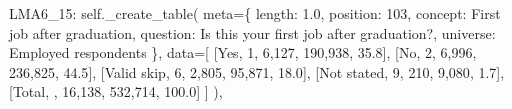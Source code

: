 \documentclass[
  11pt,
  a4paper,
]{article}
\newenvironment{Shaded}{\begin{snugshade}}{\end{snugshade}}
\newcommand{\NormalTok}[1]{\textcolor[rgb]{0.00,0.23,0.31}{#1}}
\newcommand{\OperatorTok}[1]{\textcolor[rgb]{0.37,0.37,0.37}{#1}}
\newcommand{\StringTok}[1]{\textcolor[rgb]{0.13,0.47,0.30}{#1}}
\newcommand{\VariableTok}[1]{\textcolor[rgb]{0.07,0.07,0.07}{#1}}
\begin{document}
\begin{Shaded}
\begin{Highlighting}[]
            \StringTok{\textquotesingle{}LMA6\_15\textquotesingle{}}\NormalTok{: }\VariableTok{self}\NormalTok{.\_create\_table(}
\NormalTok{                meta}\OperatorTok{=}\NormalTok{\{}
                    \StringTok{\textquotesingle{}length\textquotesingle{}}\NormalTok{: }\StringTok{\textquotesingle{}1.0\textquotesingle{}}\NormalTok{, }\StringTok{\textquotesingle{}position\textquotesingle{}}\NormalTok{: }\StringTok{\textquotesingle{}103\textquotesingle{}}\NormalTok{,}
                    \StringTok{\textquotesingle{}concept\textquotesingle{}}\NormalTok{: }\StringTok{\textquotesingle{}First job after graduation\textquotesingle{}}\NormalTok{,}
                    \StringTok{\textquotesingle{}question\textquotesingle{}}\NormalTok{: }\StringTok{\textquotesingle{}Is this your first job after graduation?\textquotesingle{}}\NormalTok{,}
                    \StringTok{\textquotesingle{}universe\textquotesingle{}}\NormalTok{: }\StringTok{\textquotesingle{}Employed respondents\textquotesingle{}}
\NormalTok{                \},}
\NormalTok{                data}\OperatorTok{=}\NormalTok{[}
\NormalTok{                    [}\StringTok{\textquotesingle{}Yes\textquotesingle{}}\NormalTok{, }\StringTok{\textquotesingle{}1\textquotesingle{}}\NormalTok{, }\StringTok{\textquotesingle{}6,127\textquotesingle{}}\NormalTok{, }\StringTok{\textquotesingle{}190,938\textquotesingle{}}\NormalTok{, }\StringTok{\textquotesingle{}35.8\textquotesingle{}}\NormalTok{],}
\NormalTok{                    [}\StringTok{\textquotesingle{}No\textquotesingle{}}\NormalTok{, }\StringTok{\textquotesingle{}2\textquotesingle{}}\NormalTok{, }\StringTok{\textquotesingle{}6,996\textquotesingle{}}\NormalTok{, }\StringTok{\textquotesingle{}236,825\textquotesingle{}}\NormalTok{, }\StringTok{\textquotesingle{}44.5\textquotesingle{}}\NormalTok{],}
\NormalTok{                    [}\StringTok{\textquotesingle{}Valid skip\textquotesingle{}}\NormalTok{, }\StringTok{\textquotesingle{}6\textquotesingle{}}\NormalTok{, }\StringTok{\textquotesingle{}2,805\textquotesingle{}}\NormalTok{, }\StringTok{\textquotesingle{}95,871\textquotesingle{}}\NormalTok{, }\StringTok{\textquotesingle{}18.0\textquotesingle{}}\NormalTok{],}
\NormalTok{                    [}\StringTok{\textquotesingle{}Not stated\textquotesingle{}}\NormalTok{, }\StringTok{\textquotesingle{}9\textquotesingle{}}\NormalTok{, }\StringTok{\textquotesingle{}210\textquotesingle{}}\NormalTok{, }\StringTok{\textquotesingle{}9,080\textquotesingle{}}\NormalTok{, }\StringTok{\textquotesingle{}1.7\textquotesingle{}}\NormalTok{],}
\NormalTok{                    [}\StringTok{\textquotesingle{}Total\textquotesingle{}}\NormalTok{, }\StringTok{\textquotesingle{}\textquotesingle{}}\NormalTok{, }\StringTok{\textquotesingle{}16,138\textquotesingle{}}\NormalTok{, }\StringTok{\textquotesingle{}532,714\textquotesingle{}}\NormalTok{, }\StringTok{\textquotesingle{}100.0\textquotesingle{}}\NormalTok{]}
\NormalTok{                ]}
\NormalTok{            ),}
            

\end{Highlighting}
\end{Shaded}
\end{document}
